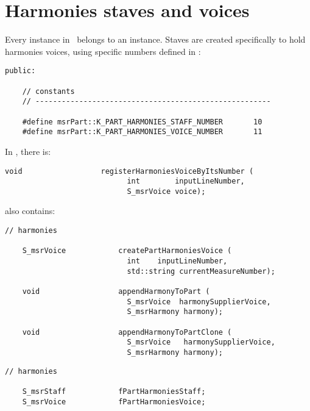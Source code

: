 \section{Harmonies staves and voices}

Every  instance in \mf\ belongs to an  instance. Staves are created specifically to hold harmonies voices, using specific numbers defined in :
\begin{lstlisting}[language=CPlusPlus]
  public:

    // constants
    // ------------------------------------------------------

    #define msrPart::K_PART_HARMONIES_STAFF_NUMBER       10
    #define msrPart::K_PART_HARMONIES_VOICE_NUMBER       11
\end{lstlisting}

In , there is:
\begin{lstlisting}[language=CPlusPlus]
    void                  registerHarmoniesVoiceByItsNumber (
                            int        inputLineNumber,
                            S_msrVoice voice);
\end{lstlisting}

 also contains:
\begin{lstlisting}[language=CPlusPlus]
   // harmonies

    S_msrVoice            createPartHarmoniesVoice (
                            int    inputLineNumber,
                            std::string currentMeasureNumber);

    void                  appendHarmonyToPart (
                            S_msrVoice  harmonySupplierVoice,
                            S_msrHarmony harmony);

    void                  appendHarmonyToPartClone (
                            S_msrVoice   harmonySupplierVoice,
                            S_msrHarmony harmony);
\end{lstlisting}

\begin{lstlisting}[language=CPlusPlus]
    // harmonies

    S_msrStaff            fPartHarmoniesStaff;
    S_msrVoice            fPartHarmoniesVoice;
\end{lstlisting}


